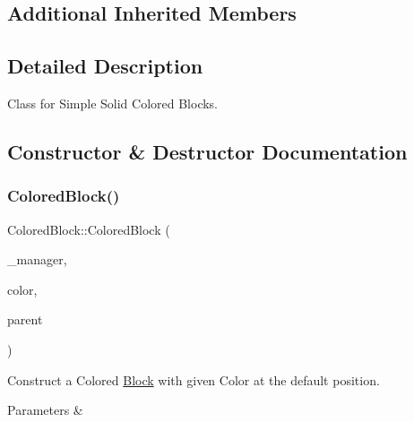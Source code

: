 \subsection*{Additional Inherited Members}


\subsection{Detailed Description}
Class for Simple Solid Colored Blocks. 

\subsection{Constructor \& Destructor Documentation}
\mbox{\label{class_colored_block_a79be4d3936cf71a57df1466131e17e38}} 
\subsubsection{\texorpdfstring{ColoredBlock()}{ColoredBlock()}\hspace{0.1cm}{\footnotesize\ttfamily [1/3]}}
{\footnotesize\ttfamily Colored\+Block\+::\+Colored\+Block (\begin{DoxyParamCaption}\item[{\mbox{\hyperlink{class_game_manager}{Game\+Manager}} $\ast$}]{\+\_\+manager,  }\item[{\mbox{\hyperlink{classsf_1_1_color}{sf\+::\+Color}}}]{color,  }\item[{\mbox{\hyperlink{class_game_entity}{Game\+Entity}} $\ast$}]{parent }\end{DoxyParamCaption})\hspace{0.3cm}{\ttfamily [inline]}}



Construct a Colored \mbox{\hyperlink{class_block}{Block}} with given Color at the default position. 


\begin{DoxyParams}{Parameters}
{\em } & \\
\hline
\end{DoxyParams}
\mbox{\label{class_colored_block_afb308406bb24c63657dbe0697e4fb40c}} 
